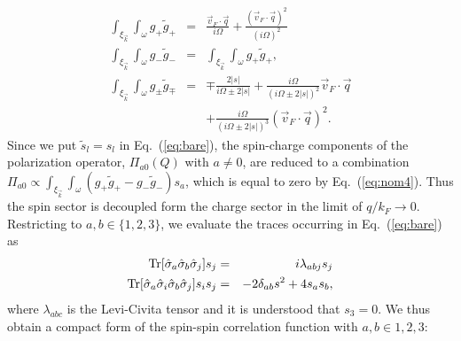 \documentclass[prb,aps,twocolumn]{revtex4}
\newcommand{\bea}{\begin{eqnarray}}
\newcommand{\eea}{\end{eqnarray}}
\newcommand{\bk}{{\vec k}}
\newcommand{\bq}{{\vec q}}
\newcommand{\bv}{{\vec v}}
\newcommand{\nn}{\nonumber}
\begin{document}
\begin{subequations}
\bea \int_{\xi_\bk}\int_\omega g_+\tilde
g_+&=&\frac{\bv_F\cdot\bq}{i\Omega}+
\frac{(\bv_F\cdot\bq)^2}{(i\Omega)^2}
\label{eq:nom3}\\
\int_{\xi_\bk}\int_\omega g_-\tilde g_-&=& \int_{\xi_\bk}\int_\omega g_+\tilde g_+,\label{eq:nom4}\\
\int_{\xi_\bk}\int_\omega g_{\pm}\tilde
g_{\mp}&=&\mp\frac{2|s|}{i\Omega\pm
2|s|}+\frac{i\Omega}{(i\Omega\pm 2|s|)^2}\bv_F\cdot\bq\nonumber\\
&&+ \frac{i\Omega}{(i\Omega\pm
2|s|)^3}(\bv_F\cdot\bq)^2.\label{eq:nom5} \eea
\end{subequations}
Since we put $\tilde s_l = s_l$ in Eq.~(\ref{eq:bare}), the
spin-charge components of the polarization operator, $\Pi_{a0}(Q)$
with $a\neq 0$, are reduced to a combination
$\Pi_{a0}\propto\int_{\xi_{\bk}}\int_{\omega}(g_+\tilde
g_+-g_-\tilde g_-)s_a$, which is equal to zero by
Eq.~(\ref{eq:nom4}). Thus the spin sector is decoupled form the
charge sector in the limit of  $q/k_F\rightarrow 0$. Restricting
to $a,b\in\{1,2,3\}$, we evaluate the traces occurring in
Eq.~(\ref{eq:bare}) as \bea\label{eq:ss}
{\rm Tr}[\hat\sigma_a\hat\sigma_b\hat\sigma_j]s_j&=&i\lambda_{abj} s_j\nn\\
{\rm
Tr}[\hat\sigma_a\hat\sigma_i\hat\sigma_b\hat\sigma_j]s_is_j&=&-2\delta_{ab}
{s}^2 +4s_as_b, \eea where $\lambda_{abc}$ is the Levi-Civita
tensor and it is understood that $s_3=0$. We thus obtain a compact
form of the spin-spin correlation function  with $a,b\in
{1,2,3}$:
\end{document}

